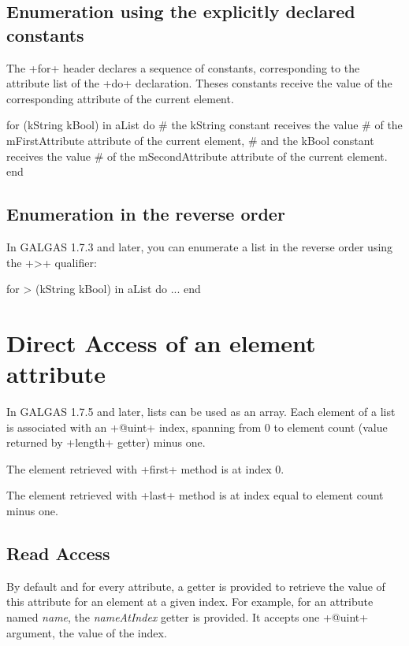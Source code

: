 \subsection{Enumeration using the explicitly declared constants}

The \ggs+for+ header declares a sequence of constants, corresponding to the attribute list of the \ggs+do+ declaration. Theses constants receive the value of the corresponding attribute of the current element.


\begin{galgas}
for (kString kBool) in aList do
  # the kString constant receives the value
  # of the mFirstAttribute attribute of the current element,
  # and the kBool constant receives the value
  # of the mSecondAttribute attribute of the current element.
end
\end{galgas}

\subsection{Enumeration in the reverse order}

In GALGAS 1.7.3 and later, you can enumerate a list in the reverse order using the \ggs+>+ qualifier:

\begin{galgas}
for > (kString kBool) in aList do
  ...
end
\end{galgas}




\section{Direct Access of an element attribute}

In GALGAS 1.7.5 and later, lists can be used as an array. Each element of a list is associated with an \ggs+@uint+ index, spanning from 0 to element count (value returned by \ggs+length+ getter) minus one.

The element retrieved with \ggs+first+ method is at index 0.

The element retrieved with \ggs+last+ method is at index equal to element count minus one.

\subsection{Read Access}

By default and for every attribute, a getter is provided to retrieve the value of this attribute for an element at a given index. For example, for an attribute named \emph{name}, the \emph{nameAtIndex} getter is provided. It accepts one \ggs+@uint+ argument, the value of the index.

